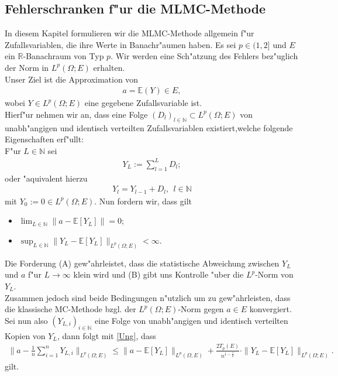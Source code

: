 \subsection{Fehlerschranken f"ur die MLMC-Methode}
In diesem Kapitel formulieren wir die MLMC-Methode allgemein f"ur Zufallsvariablen, die ihre Werte in Banachr"aumen haben.
Es sei $p\in (1,2]$ und $E$ ein $\mathbb{R}$-Banachraum von Typ $p$. Wir werden eine
Sch"atzung des Fehlers bez"uglich der Norm in $L^p(\Omega;E)$ erhalten.\\
Unser Ziel ist die Approximation von
\begin{align*}
a=\mathbb{E}(Y)\in E,
\end{align*}
wobei $Y\in L^p(\Omega;E)$ eine gegebene Zufallsvariable ist.\\
Hierf"ur nehmen wir an, dass eine Folge $(D_l)_{l\in\mathbb{N}}\subset L^p(\Omega;E)$ von unabh"angigen und identisch verteilten Zufallsvariablen existiert,welche folgende Eigenschaften erf"ullt:\\[0,1cm]
F"ur $L\in \mathbb{N}$ sei
\begin{align*}
Y_L:=\sum_{l=1}^L D_l;
\end{align*}
oder "aquivalent hierzu
\begin{align*}
Y_l=Y_{l-1}+D_l, \ \ l\in\mathbb{N}
\end{align*}
mit $Y_0:=0\in L^p(\Omega;E).$ Nun fordern wir, dass gilt
\begin{itemize}
\item[(A)]$\lim_{L\in \mathbb{N}}\|a-\mathbb{E}[Y_L]\|=0$;
\item[(B)]$\sup_{L\in\mathbb{N}}\|Y_L-\mathbb{E}[Y_L]\|_{L^p(\Omega;E)}<\infty.$
\end{itemize}
Die Forderung (A) gew"ahrleistet, dass die statistische Abweichung zwischen $Y_L$ und $a$ f"ur $L\rightarrow \infty$ klein wird und (B) gibt uns  Kontrolle "uber die $L^p$-Norm von $Y_L$.\\
Zusammen jedoch sind beide Bedingungen n"utzlich um zu gew"ahrleisten, dass die klassische MC-Methode bzgl. der $L^p(\Omega;E)$-Norm gegen $a\in E$ konvergiert. \\
Sei nun also $(Y_{L,i})_{i\in\mathbb{N}}$ eine Folge von unabh"angigen und identisch verteilten Kopien von $Y_L$, dann folgt mit \ref{Ung}, dass 
\begin{align*}
\Big\|a-\frac{1}{n}\sum_{i=1}^nY_{L,i}\Big\|_{L^p(\Omega;E)}\leq
\| a-\mathbb{E}[Y_L]\|_{L^p(\Omega,E)}+\frac{2T_p(E)}{n^{1-\frac{1}{p}}}\cdot\|Y_L-\mathbb{E}[Y_L]\|_{L^p(\Omega;E)}.
\end{align*} gilt.

